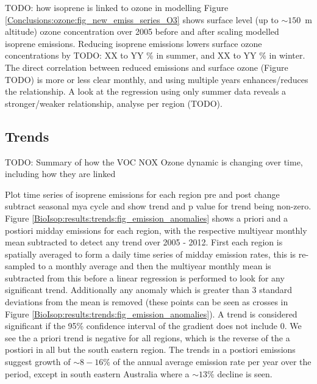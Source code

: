    TODO: how isoprene is linked to ozone in modelling 
    Figure \ref{Conclusions:ozone:fig_new_emiss_series_O3} shows surface level (up to $\sim 150$~m altitude) ozone concentration over 2005 before and after scaling modelled isoprene emissions.
    Reducing isoprene emissions lowers surface ozone concentrations by TODO: XX to YY \% in summer, and XX to YY \% in winter.
    The direct correlation between reduced emissions and surface ozone (Figure TODO) is more or less clear monthly, and using multiple years enhances/reduces the relationship.
    A look at the regression using only summer data reveals a stronger/weaker relationship, analyse per region (TODO).
  
  \subsection{Trends}
    \label{BioIsop:results:trends}
    
    TODO: Summary of how the VOC NOX Ozone dynamic is changing over time, including how they are linked
    
    
    Plot time series of isoprene emissions for each region pre and post change
    subtract seasonal mya cycle and show trend and p value for trend being non-zero.
    Figure \ref{BioIsop:results:trends:fig_emission_anomalies} shows a priori and a postiori midday emissions for each region, with the respective multiyear monthly mean subtracted to detect any trend over 2005 - 2012.
    First each region is spatially averaged to form a daily time series of midday emission rates, this is re-sampled to a monthly average and then the multiyear monthly mean is subtracted from this before a linear regression is performed to look for any significant trend.
    Additionally any anomaly which is greater than 3 standard deviations from the mean is removed (these points can be seen as crosses in Figure \ref{BioIsop:results:trends:fig_emission_anomalies}).
    A trend is considered significant if the 95\% confidence interval of the gradient does not include 0.
    We see the a priori trend is negative for all regions, which is the reverse of the a postiori in all but the south eastern region.
    The trends in a postiori emissions suggest growth of $\sim 8-16\%$ of the annual average emission rate per year over the period, except in south eastern Australia where a $\sim 13\%$ decline is seen.
    
      
